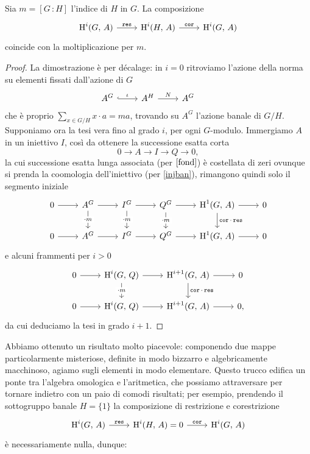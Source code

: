 \begin{theorem}
	Sia $ m = [G \,\colon H] $ l'indice di $ H $ in $ G $. La composizione
	\[\begin{tikzcd}
	\HH^i(G, \, A) \rar["\Res"] & \HH^i(H, \, A) \rar["\Cor"] & \HH^i(G, \, A)
	\end{tikzcd}  \]
	coincide con la moltiplicazione per $ m $.
\end{theorem}
\begin{proof}
	La dimostrazione è per décalage: in $ i = 0 $ ritroviamo l'azione della norma su elementi fissati dall'azione di $ G $
	\[\begin{tikzcd}
	A^G \rar["\iota", hookrightarrow] & A^H \rar["N"] & A^G &
	\end{tikzcd}  \]
	che è proprio $ \sum_{x \in G/H} x \cdot a = ma $, trovando su $ A^G $ l'azione banale di $ G/H $.
	Supponiamo ora la tesi vera fino al grado $ i $, per ogni $ G $-modulo. Immergiamo $ A $ in un iniettivo $ I $, così da ottenere la successione esatta corta
	\[ 0 \to A \to I \to Q \to 0, \]
	la cui successione esatta lunga associata (per $ \ref{fond} $) è costellata di zeri ovunque si prenda la coomologia dell'iniettivo (per \ref{injban}), rimangono quindi solo il segmento iniziale
	\[\begin{tikzcd}
	0 \rar
	& A^G \rar\dar["\cdot m" description]
	& I^G \rar\dar["\cdot m" description] 
	& Q^G \rar\dar["\cdot m" description] 
	& \HH^1(G, \, A) \rar\dar["\Cor \cdot \Res"] 
	& 0 \\
	0 \rar 
	& A^G \rar 
	& I^G \rar 
	& Q^G \rar 
	& \HH^1(G, \, A) \rar 
	& 0
	\end{tikzcd}\]
	e alcuni frammenti per $ i > 0 $
	\[\begin{tikzcd}
	0 \rar & \HH^i(G, \, Q) \rar\dar["\cdot m" description] & \HH^{i+1}(G, \, A) \rar\dar["\Cor \cdot \Res"] & 0 \\
	0 \rar & \HH^i(G, \, Q) \rar & \HH^{i+1}(G, \, A) \rar & 0,
	\end{tikzcd}\]
	da cui deduciamo la tesi in grado $ i+1 $.
\end{proof}

Abbiamo ottenuto un risultato molto piacevole: componendo due mappe particolarmente misteriose, definite in modo bizzarro e algebricamente macchinoso, agiamo sugli elementi in modo elementare. Questo trucco edifica un ponte tra l'algebra omologica e l'aritmetica, che possiamo attraversare per tornare indietro con un paio di comodi risultati; per esempio, prendendo il sottogruppo banale $ H = \{1\} $ la composizione di restrizione e corestrizione
\[\begin{tikzcd}
\HH^i(G, \, A) \rar["\Res"] & \HH^i(H, \, A) = 0 \rar["\Cor"] & \HH^i(G, \, A)
\end{tikzcd}  \]
è necessariamente nulla, dunque:

